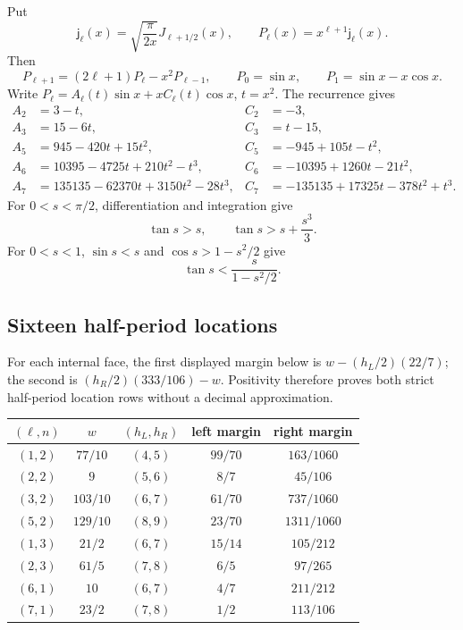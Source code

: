 \documentclass[11pt]{article}
\begin{document}
Put
\[
 \mathsf j_\ell(x)=\sqrt{\frac{\pi}{2x}}J_{\ell+1/2}(x),
 \qquad P_\ell(x)=x^{\ell+1}\mathsf j_\ell(x).
\]
Then
\begin{equation}
 P_{\ell+1}=(2\ell+1)P_\ell-x^2P_{\ell-1},
 \qquad P_0=\sin x,\qquad P_1=\sin x-x\cos x.
 \label{eq:P-rec}
\end{equation}
Write
\(P_\ell=A_\ell(t)\sin x+xC_\ell(t)\cos x\), \(t=x^2\).
The recurrence gives
\begin{align*}
 A_2&=3-t,&C_2&=-3,\\
 A_3&=15-6t,&C_3&=t-15,\\
 A_5&=945-420t+15t^2,&C_5&=-945+105t-t^2,\\
 A_6&=10395-4725t+210t^2-t^3,
 &C_6&=-10395+1260t-21t^2,\\
 A_7&=135135-62370t+3150t^2-28t^3,
 &C_7&=-135135+17325t-378t^2+t^3.
\end{align*}
For \(0<s<\pi/2\), differentiation and integration give
\begin{equation}
 \tan s>s,\qquad \tan s>s+\frac{s^3}{3}.
 \label{eq:tan-lower}
\end{equation}
For \(0<s<1\), \(\sin s<s\) and
\(\cos s>1-s^2/2\) give
\begin{equation}
 \tan s<\frac{s}{1-s^2/2}.
 \label{eq:tan-upper}
\end{equation}

\subsection{Sixteen half-period locations}

For each internal face, the first displayed margin below is
\(w-(h_L/2)(22/7)\); the second is
\((h_R/2)(333/106)-w\).  Positivity therefore proves both strict
half-period location rows without a decimal approximation.
\begin{center}
\small
\begin{tabular}{c|c|c|c|c}
\toprule
\((\ell,n)\)&\(w\)&\((h_L,h_R)\)&left margin&right margin\\
\midrule
\((1,2)\)&\(77/10\)&\((4,5)\)&\(99/70\)&\(163/1060\)\\
\((2,2)\)&\(9\)&\((5,6)\)&\(8/7\)&\(45/106\)\\
\((3,2)\)&\(103/10\)&\((6,7)\)&\(61/70\)&\(737/1060\)\\
\((5,2)\)&\(129/10\)&\((8,9)\)&\(23/70\)&\(1311/1060\)\\
\((1,3)\)&\(21/2\)&\((6,7)\)&\(15/14\)&\(105/212\)\\
\((2,3)\)&\(61/5\)&\((7,8)\)&\(6/5\)&\(97/265\)\\
\((6,1)\)&\(10\)&\((6,7)\)&\(4/7\)&\(211/212\)\\
\((7,1)\)&\(23/2\)&\((7,8)\)&\(1/2\)&\(113/106\)\\
\bottomrule
\end{tabular}
\end{center}
\end{document}
